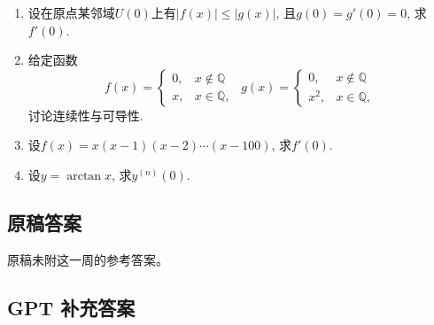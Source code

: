 \documentclass[UTF8,11pt, a4paper, oneside, fontset=none]{ctexbook}
\begin{document}
\begin{enumerate}
证明: 若$x =a $是$f(x)$的$k$重根, 则$x =a $也是$f'(x)$的$k-1$重根.

\item 设在原点某邻域$U(0)$上有$|f(x)| \leq |g(x)|$, 且$g(0) = g'(0) =0$, 求$f'(0)$.
\item 给定函数
\[
f(x) = \begin{cases}
0, & x \notin \mathbb Q\\
x, & x \in \mathbb Q,
\end{cases} \ \ 
g(x) =  \begin{cases}
0, & x \notin \mathbb Q\\
x^2, & x \in \mathbb Q,
\end{cases}
\]
讨论连续性与可导性.

\item 设$f(x) = x(x-1)(x-2) \cdots (x-100)$, 求$f'(0)$.

\item 设$y = \arctan x$, 求$y^{(n)}(0)$.

\end{enumerate}

\clearpage

\subsection*{原稿答案}

\noindent 原稿未附这一周的参考答案。

\clearpage

\subsection*{GPT 补充答案}
\end{document}
